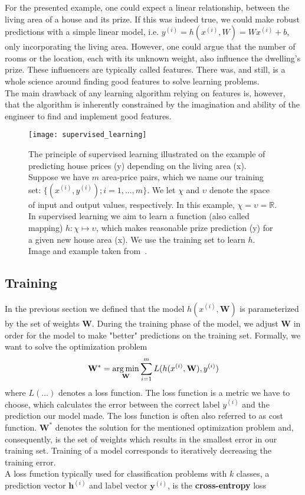 For the presented example, one could expect a linear relationship, between the living area of a house and its prize. If this was indeed true, we could make robust predictions with a simple linear model, i.e. $y^{(i)} = h(x^{(i)}, W) = Wx^{(i)} + b$, only incorporating the living area. However, one could argue that the number of rooms or the location, each with its unknown weight, also influence the dwelling's prize. These influencers are typically called features. There was, and still, is a whole science around finding good features to solve learning problems.\\
The main drawback of any learning algorithm relying on features is, however, that the algorithm is inherently constrained by the imagination and ability of the engineer to find and implement good features.

\begin{figure}[htbp]
    \centering
	\texttt{[image: supervised\_learning]}
    \caption[Supervised Learning]{The principle of supervised learning illustrated on the example of predicting house prices (y) depending on the living area (x). Suppose we have $m$ area-price pairs, which we name our training set: $\{(x^{(i)}, y^{(i)}); i = 1,...,m\}$. We let $\chi$ and $\upsilon$ denote the space of input and output values, respectively. In this example, $\chi = \upsilon = \mathbb{R}$. In supervised learning we aim to learn a function (also called mapping) $h : \chi \mapsto \upsilon$, which makes reasonable prize prediction (y) for a given new house area (x). We use the training set to learn $h$. Image and example taken from~\cite{Ng2012StanfordNotes}.}
    \label{fig:dl_supervised}
\end{figure}

\subsection{Training}
In the previous section we defined that the model $h(x^{(i)}, \mathbf{W})$ is parameterized by the set of weights $\textbf{W}$. During the training phase of the model, we adjust $\textbf{W}$ in order for the model to make "better" predictions on the training set. Formally, we want to solve the optimization problem
\begin{equation}
   \mathbf{W}^{*} = \operatorname*{arg\,min}_\textbf{W} \sum_{i=1}^{m} L(h(x^{(i)}, \mathbf{W}), y^{(i)})
   \label{eq:optimization}
\end{equation}
where $L(...)$ denotes a loss function. The loss function is a metric we have to choose, which calculates the error between the correct label $y^{(i)}$ and the prediction our model made. The loss function is often also referred to as cost function. $\mathbf{W}^{*}$ denotes the solution for the mentioned optimization problem and, consequently, is the set of weights which results in the smallest error in our training set. Training of a model corresponds to iteratively decreasing the training error.\\
A loss function typically used for classification problems with $k$ classes, a prediction vector $\mathbf{h}^{(i)}$ and label vector $\mathbf{y}^{(i)}$, is the \textbf{cross-entropy} loss

